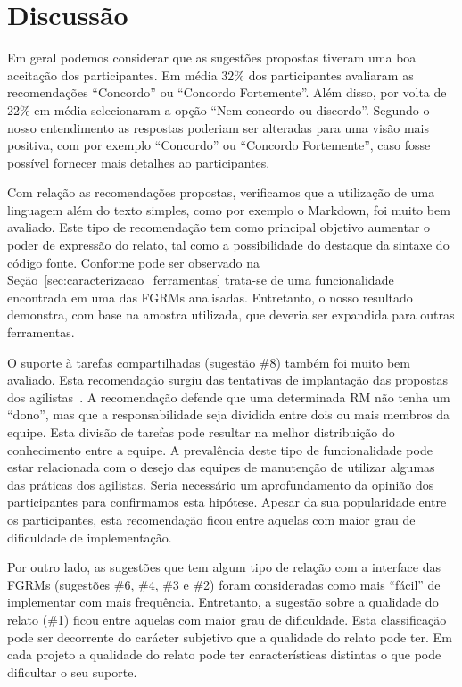 \section{Discussão}
\label{sec:sug_melhoria_discussao}

Em geral podemos considerar que as sugestões propostas tiveram uma boa aceitação
dos participantes. Em média 32\% dos participantes avaliaram as recomendações
``Concordo'' ou ``Concordo Fortemente''.  Além disso, por volta de 22\% em média
selecionaram a opção ``Nem concordo ou discordo''. Segundo o nosso entendimento
as respostas poderiam ser alteradas para uma visão mais positiva, com por
exemplo ``Concordo'' ou ``Concordo Fortemente'', caso fosse possível fornecer
mais detalhes ao participantes.

Com relação as recomendações propostas, verificamos que a utilização de uma
linguagem além do texto simples, como por exemplo o Markdown, foi muito bem
avaliado. Este tipo de recomendação tem como principal objetivo aumentar o
poder de expressão do relato, tal como a possibilidade do destaque da sintaxe
do código fonte. Conforme pode ser observado na
Seção~\ref{sec:caracterizacao_ferramentas} trata-se de uma funcionalidade
encontrada em uma das FGRMs analisadas. Entretanto, o nosso resultado
demonstra, com base na amostra utilizada, que deveria ser expandida para outras
ferramentas.

O suporte à tarefas compartilhadas (sugestão \#8) também foi muito bem avaliado.
Esta recomendação surgiu das tentativas de implantação das propostas dos
agilistas~\cite{svensson2005introducing}. A recomendação defende que uma
determinada RM não tenha um ``dono'', mas que a responsabilidade seja dividida
entre dois ou mais membros da equipe. Esta divisão de tarefas pode resultar na
melhor distribuição do conhecimento entre a equipe. A prevalência deste tipo de
funcionalidade pode estar relacionada com o desejo das equipes de manutenção de
utilizar algumas das práticas dos agilistas. Seria necessário um aprofundamento
da opinião dos participantes para confirmamos esta hipótese. Apesar da sua
popularidade entre os participantes, esta recomendação ficou entre aquelas com
maior grau de dificuldade de implementação.

Por outro lado, as sugestões que tem algum tipo de relação com a interface das
FGRMs (sugestões \#6, \#4, \#3 e \#2) foram consideradas como mais ``fácil'' de
implementar com mais frequência. Entretanto, a sugestão sobre a qualidade do
relato (\#1) ficou entre aquelas com maior grau de dificuldade. Esta
classificação pode ser decorrente do carácter subjetivo que a qualidade do
relato pode ter. Em cada projeto a qualidade do relato pode ter características
distintas o que pode dificultar o seu suporte.


